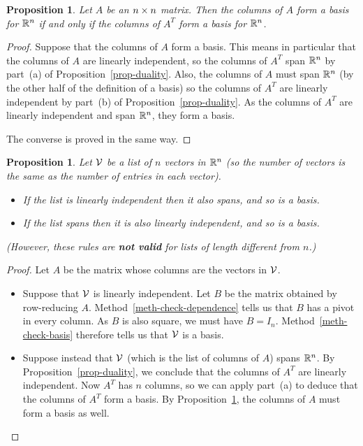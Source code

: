 \documentclass[reqno]{amsart}
\newtheorem{proposition}[theorem]{Proposition}
\theoremstyle{definition}
\begin{document}
\begin{proposition}\label{prop-duality-bases}
 Let $A$ be an $n\times n$ matrix.  Then the columns of $A$ form a basis
 for ${\mathbb{R}}^n$ if and only if the columns of $A^T$ form a basis for
 ${\mathbb{R}}^n$.
\end{proposition}
\begin{proof}
 Suppose that the columns of $A$ form a basis.  This means in
 particular that the columns of $A$ are linearly independent, so the
 columns of $A^T$ span ${\mathbb{R}}^n$ by part~(a) of
 Proposition~\ref{prop-duality}.  Also, the columns of $A$ must span
 ${\mathbb{R}}^n$ (by the other half of the definition of a basis) so the
 columns of $A^T$ are linearly independent by part~(b) of
 Proposition~\ref{prop-duality}.  As the columns of $A^T$ are linearly
 independent and span ${\mathbb{R}}^n$, they form a basis.

 The converse is proved in the same way.
\end{proof}

\begin{proposition}\label{prop-basis-numerical}
 Let $\mathcal{V}$ be a list of $n$ vectors in ${\mathbb{R}}^n$ (so the number of
 vectors is the same as the number of entries in each vector).
 \begin{itemize}
  \item[(a)] If the list is linearly independent then it also spans,
   and so is a basis.
  \item[(b)] If the list spans then it is also linearly independent,
   and so is a basis.
 \end{itemize}
 (However, these rules are \textbf{not valid} for lists of length
 different from $n$.)
\end{proposition}
\begin{proof}
 Let $A$ be the matrix whose columns are the vectors in $\mathcal{V}$.
 \begin{itemize}
 \item[(a)] Suppose that $\mathcal{V}$ is linearly independent.  Let $B$ be
  the matrix obtained by row-reducing $A$.
  Method~\ref{meth-check-dependence} tells us that $B$ has a pivot in
  every column.  As $B$ is also square, we must have $B=I_n$.
  Method~\ref{meth-check-basis} therefore tells us that $\mathcal{V}$ is a
  basis.
 \item[(b)] Suppose instead that $\mathcal{V}$ (which is the list of columns
  of $A$) spans ${\mathbb{R}}^n$.  By Proposition~\ref{prop-duality}, we
  conclude that the columns of $A^T$ are linearly independent.  Now
  $A^T$ has $n$ columns, so we can apply part~(a) to deduce that the
  columns of $A^T$ form a basis.  By
  Proposition~\ref{prop-duality-bases}, the columns of $A$ must form a
  basis as well.
 \end{itemize}
\end{proof}
\end{document}

